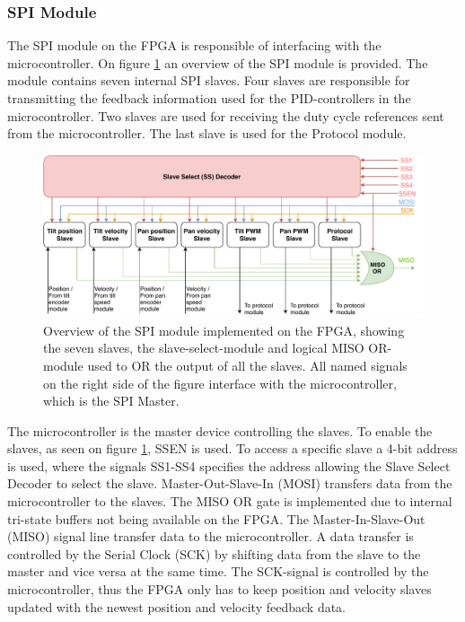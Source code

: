 \documentclass[../../main.tex]{subfiles}
\begin{document}
\subsubsection*{SPI Module}

The SPI module on the FPGA is responsible of interfacing with the microcontroller. On figure \ref{fig:SPILogicSimple} an overview of the SPI module is provided. The module contains seven internal SPI slaves. Four slaves are responsible for transmitting the feedback information used for the PID-controllers in the microcontroller. Two slaves are used for receiving the duty cycle references sent from the microcontroller. The last slave is used for the Protocol module.

\begin{figure}[H]
    \centering
    \includegraphics[width=\textwidth]{Sections/System_Implementation/Images/SPILogicSimple.pdf}
    \caption{Overview of the SPI module implemented on the FPGA, showing the seven slaves, the slave-select-module and logical MISO OR-module used to OR the output of all the slaves. All named signals on the right side of the figure interface with the microcontroller, which is the SPI Master. } %
    \label{fig:SPILogicSimple}
\end{figure}

The microcontroller is the master device controlling the slaves. To enable the slaves, as seen on figure \ref{fig:SPILogicSimple}, SSEN is used. To access a specific slave a 4-bit address is used, where the signals SS1-SS4 specifies the address allowing the Slave Select Decoder to select the slave. Master-Out-Slave-In (MOSI) transfers data from the microcontroller to the slaves. The MISO OR gate is implemented due to internal tri-state buffers not being available on the FPGA. The Master-In-Slave-Out (MISO) signal line transfer data to the microcontroller. A data transfer is controlled by the Serial Clock (SCK) by shifting data from the slave to the master and vice versa at the same time. The SCK-signal is controlled by the microcontroller, thus the FPGA only has to keep position and velocity slaves updated with the newest position and velocity feedback data. 
\end{document}
